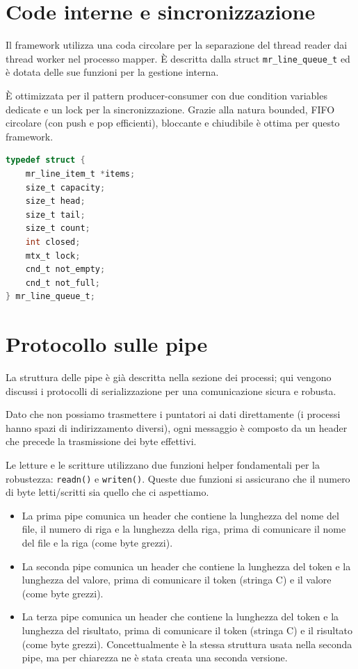 \documentclass[11pt,a4paper]{article}
\begin{document}
\section{Code interne e sincronizzazione}

Il framework utilizza una coda circolare per la separazione del thread reader dai thread worker nel processo mapper. È descritta dalla struct \texttt{mr\_line\_queue\_t} ed è dotata delle sue funzioni per la gestione interna.

È ottimizzata per il pattern producer-consumer con due condition variables dedicate e un lock per la sincronizzazione. Grazie alla natura bounded, FIFO circolare (con push e pop efficienti), bloccante e chiudibile è ottima per questo framework.

\begin{lstlisting}[language=C]
typedef struct {
    mr_line_item_t *items;
    size_t capacity;
    size_t head;
    size_t tail;
    size_t count;
    int closed;
    mtx_t lock;
    cnd_t not_empty;
    cnd_t not_full;
} mr_line_queue_t;
\end{lstlisting}

\newpage
\section{Protocollo sulle pipe}

La struttura delle pipe è già descritta nella sezione dei processi; qui vengono discussi i protocolli di serializzazione per una comunicazione sicura e robusta.

Dato che non possiamo trasmettere i puntatori ai dati direttamente (i processi hanno spazi di indirizzamento diversi), ogni messaggio è composto da un header che precede la trasmissione dei byte effettivi.

Le letture e le scritture utilizzano due funzioni helper fondamentali per la robustezza: \texttt{readn()} e \texttt{writen()}. Queste due funzioni si assicurano che il numero di byte letti/scritti sia quello che ci aspettiamo.

\begin{itemize}
    \item La prima pipe comunica un header che contiene la lunghezza del nome del file, il numero di riga e la lunghezza della riga, prima di comunicare il nome del file e la riga (come byte grezzi).

    \item La seconda pipe comunica un header che contiene la lunghezza del token e la lunghezza del valore, prima di comunicare il token (stringa C) e il valore (come byte grezzi).

    \item La terza pipe comunica un header che contiene la lunghezza del token e la lunghezza del risultato, prima di comunicare il token (stringa C) e il risultato (come byte grezzi). Concettualmente è la stessa struttura usata nella seconda pipe, ma per chiarezza ne è stata creata una seconda versione.
\end{itemize}
\end{document}
